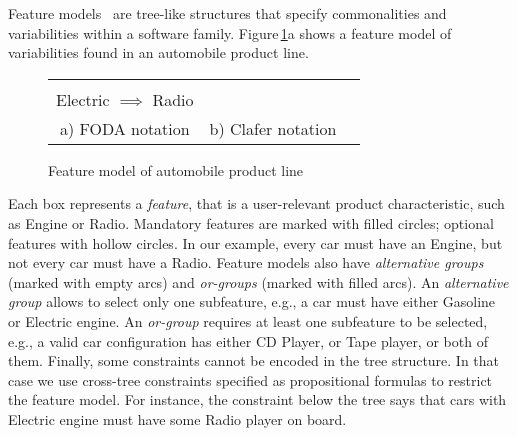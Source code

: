 \documentclass{llncs}
\newcommand{\Figref}[1]{Figure\,\ref{fig:#1}}
\begin{document}
Feature models~\cite{kang:foda:1990} are tree-like structures that specify commonalities and variabilities within a software family. \Figref{autofm}a shows a feature model of variabilities found in an automobile product line.

\begin{figure}[t]
  \begin{center}
    \begin{tabular}{ccc}
      \begin{minipage}[t]{8cm}
        \begin{center}
          \scalebox{1.0}{
            \begin{fbundle}{\featbox{Automobile}}
              \fchunk[m]{
                \begin{fbundle}[x][1]{\featbox{Engine}}
                  \fchunk{\featbox{Gasoline}}
                  \fchunk{\featbox{Electric}}
                \end{fbundle}
              }
              \fchunk[o]{
                \begin{fbundle}[o][1]{\featbox{Radio}}
                  \fchunk{\featbox{CD Player}}
                  \fchunk{\featbox{Tape}}
                \end{fbundle}
              }
            \end{fbundle}
          }
        \end{center}
      \end{minipage}
      &
      \begin{minipage}{3cm}
        
      \end{minipage}\\
      \textsf{Electric} $\implies$ \textsf{Radio}
      &
      \\[0.2cm]
      a) FODA notation & b) Clafer notation
    \end{tabular}
  \end{center}
  \caption{Feature model of automobile product line\label{fig:autofm}}
\end{figure}

Each box represents a \emph{feature}, that is a user-relevant product characteristic, such as \textsf{Engine} or \textsf{Radio}. Mandatory features are marked with filled circles; optional features with hollow circles. In our example, every car must have an \textsf{Engine}, but not every car must have a \textsf{Radio}. Feature models also have \emph{alternative groups} (marked with empty arcs) and \emph{or-groups} (marked with filled arcs). An \emph{alternative group} allows to select only one subfeature, e.g., a car must have either \textsf{Gasoline} or \textsf{Electric} engine. An \emph{or-group} requires at least one subfeature to be selected, e.g., a valid car configuration has either \textsf{CD Player}, or \textsf{Tape} player, or both of them. Finally, some constraints cannot be encoded in the tree structure. In that case we use cross-tree constraints specified as propositional formulas to restrict the feature model. For instance, the constraint below the tree says that cars with \textsf{Electric} engine must have some \textsf{Radio} player on board.
\end{document}

